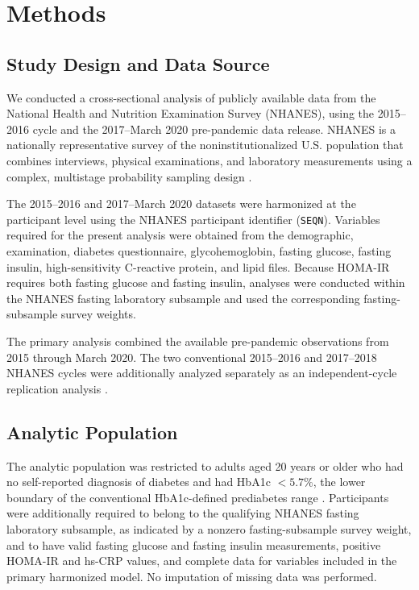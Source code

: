 \documentclass[11pt]{article}
\begin{document}

\section{Methods}

\subsection{Study Design and Data Source}

We conducted a cross-sectional analysis of publicly available data from the
National Health and Nutrition Examination Survey (NHANES), using the
2015--2016 cycle and the 2017--March 2020 pre-pandemic data release.
NHANES is a nationally representative survey of the noninstitutionalized
U.S. population that combines interviews, physical examinations, and
laboratory measurements using a complex, multistage probability sampling
design \citep{NHANES2017_2020Guidelines}.

The 2015--2016 and 2017--March 2020 datasets were harmonized at the
participant level using the NHANES participant identifier (\texttt{SEQN}).
Variables required for the present analysis were obtained from the
demographic, examination, diabetes questionnaire, glycohemoglobin,
fasting glucose, fasting insulin, high-sensitivity C-reactive protein,
and lipid files. Because HOMA-IR requires both fasting glucose and fasting
insulin, analyses were conducted within the NHANES fasting laboratory
subsample and used the corresponding fasting-subsample survey weights.

The primary analysis combined the available pre-pandemic observations
from 2015 through March 2020. The two conventional 2015--2016 and
2017--2018 NHANES cycles were additionally analyzed separately as an
independent-cycle replication analysis \citep{NHANES2017_2020Guidelines}.


\subsection{Analytic Population}

The analytic population was restricted to adults aged 20 years or older
who had no self-reported diagnosis of diabetes and had HbA1c $<5.7\%$,
the lower boundary of the conventional HbA1c-defined prediabetes range
\citep{ADA2026Diagnosis}. Participants were additionally required to belong
to the qualifying NHANES fasting laboratory subsample, as indicated by a
nonzero fasting-subsample survey weight, and to have valid fasting glucose
and fasting insulin measurements, positive HOMA-IR and hs-CRP values, and
complete data for variables included in the primary harmonized model. No
imputation of missing data was performed.
\end{document}
